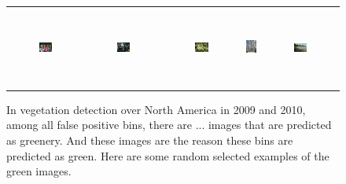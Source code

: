 \begin{figure}[th]
{{\begin{center}
\begin{tabular}{@{}c@{\,\,\,}c@{\,\,\,}c@{\,\,\,}c@{\,\,\,}c@{\,\,\,}}
\includegraphics[width=0.19\textwidth]{imggrid/falseposi/16.jpg} &
\includegraphics[width=0.19\textwidth]{imggrid/falseposi/17.jpg} &
\includegraphics[width=0.19\textwidth]{imggrid/falseposi/18.jpg} &
\includegraphics[height=1in]{imggrid/falseposi/19.jpg} &
\includegraphics[width=0.19\textwidth]{imggrid/falseposi/20.jpg} \\
\end{tabular}
\end{center}
}}
\caption{In vegetation detection over North America in 2009 and 2010, among all false positive bins, there are ... images that are predicted as greenery. And these images are the reason these bins are predicted as green. Here are some random selected examples of the green images.}
\label{fig:falseposi}
\end{figure}

